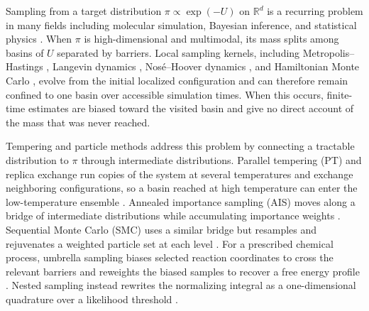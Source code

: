 \documentclass{article}
\begin{document}
Sampling from a target distribution $\pi \propto \exp(-U)$ on $\mathbb R^d$ is a recurring problem in many fields including molecular simulation, Bayesian inference, and statistical physics \citep{frenkel2002understanding,robert2004monte,landau2014guide}. When $\pi$ is high-dimensional and multimodal, its mass splits among basins of $U$ separated by barriers. Local sampling kernels, including Metropolis--Hastings \citep{metropolis1953equation,hastings1970monte}, Langevin dynamics \citep{langevin1908theorie,leimkuhler2015molecular}, Nos{\'e}--Hoover dynamics \citep{nose1984unified,hoover1985canonical}, and Hamiltonian Monte Carlo \citep{duane1987hybrid}, evolve from the initial localized configuration and can therefore remain confined to one basin over accessible simulation times. When this occurs, finite-time estimates are biased toward the visited basin and give no direct account of the mass that was never reached.

Tempering and particle methods address this problem by connecting a tractable distribution to $\pi$ through intermediate distributions. Parallel tempering (PT) and replica exchange run copies of the system at several temperatures and exchange neighboring configurations, so a basin reached at high temperature can enter the low-temperature ensemble \citep{swendsen1986replica,geyer1991markov,hukushima1996exchange}. Annealed importance sampling (AIS) moves along a bridge of intermediate distributions while accumulating importance weights \citep{neal2001annealed}. Sequential Monte Carlo (SMC) uses a similar bridge but resamples and rejuvenates a weighted particle set at each level \citep{doucet2001introduction,delmoral2006sequential}. For a prescribed chemical process, umbrella sampling biases selected reaction coordinates to cross the relevant barriers and reweights the biased samples to recover a free energy profile \citep{torrie1977umbrella,kastner2011umbrella}. Nested sampling instead rewrites the normalizing integral as a one-dimensional quadrature over a likelihood threshold \citep{skilling2006nested}.
\end{document}
